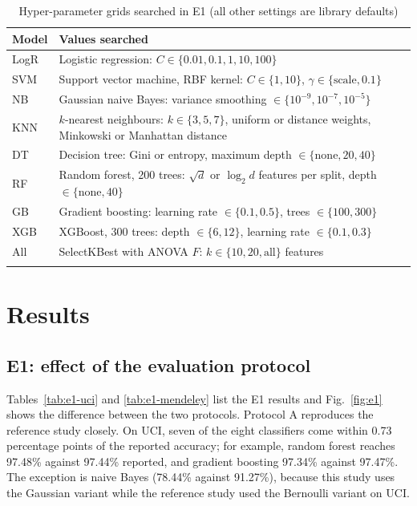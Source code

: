\documentclass[pdflatex,sn-mathphys-num]{sn-jnl}%
\theoremstyle{thmstyleone}%
\theoremstyle{thmstyletwo}%
\theoremstyle{thmstylethree}%
\begin{document}
\begin{table}[htbp]
\caption{Hyper-parameter grids searched in E1 (all other settings are library defaults)}\label{tab:grid}%
\begin{tabular}{@{}lp{}@{}}
\toprule
Model & Values searched\\
\midrule
LogR & Logistic regression: $C \in \{0.01, 0.1, 1, 10, 100\}$ \\
SVM & Support vector machine, RBF kernel: $C \in \{1, 10\}$, $\gamma \in \{\text{scale}, 0.1\}$ \\
NB & Gaussian naive Bayes: variance smoothing $\in \{10^{-9}, 10^{-7}, 10^{-5}\}$ \\
KNN & $k$-nearest neighbours: $k \in \{3,5,7\}$, uniform or distance weights, Minkowski or Manhattan distance \\
DT & Decision tree: Gini or entropy, maximum depth $\in \{\text{none}, 20, 40\}$ \\
RF & Random forest, 200 trees: $\sqrt{d}$ or $\log_2 d$ features per split, depth $\in \{\text{none}, 40\}$ \\
GB & Gradient boosting: learning rate $\in \{0.1, 0.5\}$, trees $\in \{100, 300\}$ \\
XGB & XGBoost, 300 trees: depth $\in \{6, 12\}$, learning rate $\in \{0.1, 0.3\}$ \\
All & SelectKBest with ANOVA $F$: $k \in \{10, 20, \text{all}\}$ features \\
\botrule
\end{tabular}
\end{table}

\section{Results}\label{sec5}

\subsection{E1: effect of the evaluation protocol}\label{subsec5-1}

Tables~\ref{tab:e1-uci} and \ref{tab:e1-mendeley} list the E1 results and Fig.~\ref{fig:e1} shows the difference between the two protocols. Protocol A reproduces the reference study closely. On UCI, seven of the eight classifiers come within 0.73 percentage points of the reported accuracy; for example, random forest reaches 97.48\% against 97.44\% reported, and gradient boosting 97.34\% against 97.47\%. The exception is naive Bayes (78.44\% against 91.27\%), because this study uses the Gaussian variant while the reference study used the Bernoulli variant on UCI.
\end{document}
